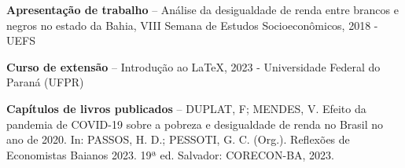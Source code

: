 \documentclass[10pt,a4paper]{cv}
\begin{document}


\divider


\divider





\textbf{Apresentação de trabalho} -- Análise da desigualdade de renda entre brancos e negros no estado da Bahia, VIII Semana de Estudos Socioeconômicos, 2018 - UEFS

\textbf{Curso de extensão} -- Introdução ao \LaTeX{}, 2023 - Universidade Federal do Paraná (UFPR)

\textbf{Capítulos de livros publicados} -- DUPLAT, F; MENDES, V. Efeito da pandemia de COVID-19 sobre a pobreza e desigualdade de renda no Brasil no ano de 2020. In: PASSOS, H. D.; PESSOTI, G. C. (Org.). Reflexões de Economistas Baianos 2023. 19ª ed. Salvador: CORECON-BA, 2023.








\end{document}
